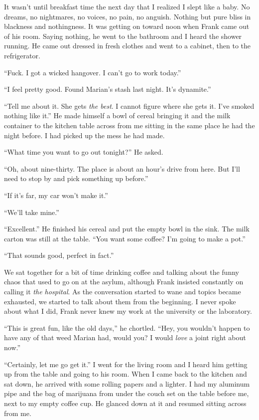 It wasn't until breakfast time the next day that I realized I slept like
a baby. No dreams, no nightmares, no voices, no pain, no anguish.
Nothing but pure bliss in blackness and nothingness. It was getting on
toward noon when Frank came out of his room. Saying nothing, he went to
the bathroom and I heard the shower running. He came out dressed in
fresh clothes and went to a cabinet, then to the refrigerator.

``Fuck. I got a wicked hangover. I can't go to work today.''

``I feel pretty good. Found Marian's stash last night. It's dynamite.''

``Tell me about it. She gets \emph{the best}. I cannot figure where she
gets it. I've smoked nothing like it.'' He made himself a bowl of cereal
bringing it and the milk container to the kitchen table across from me
sitting in the same place he had the night before. I had picked up the
mess he had made.

``What time you want to go out tonight?'' He asked.

``Oh, about nine-thirty. The place is about an hour's drive from here.
But I'll need to stop by and pick something up before.''

``If it's far, my car won't make it.''

``We'll take mine.''

``Excellent.'' He finished his cereal and put the empty bowl in the
sink. The milk carton was still at the table. ``You want some coffee?
I'm going to make a pot.''

``That sounds good, perfect in fact.''

We sat together for a bit of time drinking coffee and talking about the
funny chaos that used to go on at the asylum, although Frank insisted
constantly on calling it \emph{the hospital}. As the conversation
started to wane and topics became exhausted, we started to talk about
them from the beginning. I never spoke about what I did, Frank never
knew my work at the university or the laboratory.

``This is great fun, like the old days,'' he chortled. ``Hey, you
wouldn't happen to have any of that weed Marian had, would you? I would
\emph{love} a joint right about now.''

``Certainly, let me go get it.'' I went for the living room and I heard
him getting up from the table and going to his room. When I came back to
the kitchen and sat down, he arrived with some rolling papers and a
lighter. I had my aluminum pipe and the bag of marijuana from under the
couch set on the table before me, next to my empty coffee cup. He
glanced down at it and resumed sitting across from me.

